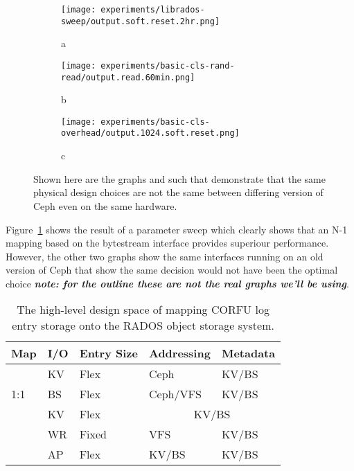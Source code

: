 \documentclass[10pt,twocolumn]{article}
\begin{document}
\begin{figure*}[!ht]
    \centering
    \begin{subfigure}{.6\columnwidth}
        \texttt{[image: experiments/librados-sweep/output.soft.reset.2hr.png]}
        \caption{a}
        \label{fig:vanilla-io-diff}
    \end{subfigure}\hfill
    \begin{subfigure}{.6\columnwidth}
        \texttt{[image: experiments/basic-cls-rand-read/output.read.60min.png]}
        \caption{b}
    \end{subfigure}\hfill
    \begin{subfigure}{.6\columnwidth}
        \texttt{[image: experiments/basic-cls-overhead/output.1024.soft.reset.png]}
        \caption{c}
    \end{subfigure}\hfill
    \caption{Shown here are the graphs and such that demonstrate that the same
        physical design choices are not the same between differing version of
    Ceph even on the same hardware.}
\end{figure*}

Figure~\ref{fig:vanilla-io-diff} shows the result of a parameter sweep which
clearly shows that an N-1 mapping based on the bytestream interface provides
superiour performance. However, the other two graphs show the same interfaces
running on an old version of Ceph that show the same decision would not have
been the optimal choice {\bf \emph{note: for the outline these are not the
real graphs we'll be using}}.

\begin{table}
\begin{tabular}{ | l | l | l | l | l |}
\hline
Map & I/O & Entry Size & Addressing & Metadata \\ \hline
\multirow{3}{*}{1:1} & KV  & Flex     & Ceph      & KV/BS \\ \cline{2-5}
                     & BS  & Flex     & Ceph/VFS  & KV/BS \\ \hline
\multirow{4}{*}{N:1} & KV  & Flex     & \multicolumn{2}{|c|}{KV/BS} \\ \cline{2-5}
                     & WR  & Fixed    & VFS       & KV/BS \\ \cline{2-5}
                     & AP  & Flex     & KV/BS     & KV/BS \\
\hline
\end{tabular}
\caption{The high-level design space of mapping CORFU log entry storage onto
the RADOS object storage system.}
\label{tab:pd-map}
\end{table}
\end{document}
